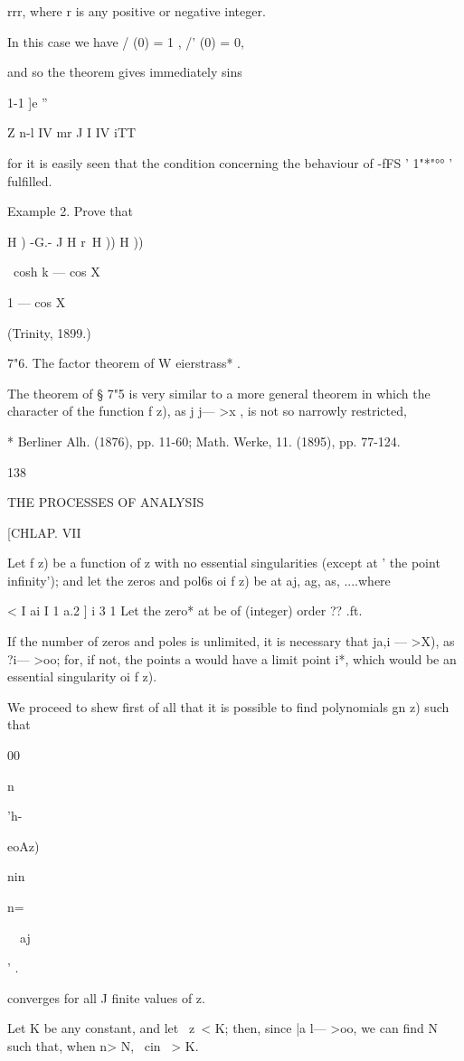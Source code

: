 rrr, where r is any positive or negative integer.

In this case we have / (0) = 1 , /' (0) = 0,

and so the theorem gives immediately sins

1-1 ]e ''

Z n-l IV mr J I IV iTT

for it is easily seen that the condition concerning the behaviour of
-fFS ' 1"*"°° ' fulfilled.

Example 2. Prove that

H ) -G.- J H r\ H )) H ))

\ cosh k — cos X

1 — cos X

(Trinity, 1899.)

7"6. The factor theorem of W eierstrass* .

The theorem of § 7"5 is very similar to a more general theorem in
which the character of the function f z), as j j— >x , is not so
narrowly restricted,

* Berliner Alh. (1876), pp. 11-60; Math. Werke, 11. (1895), pp.
77-124.

138

THE PROCESSES OF ANALYSIS

[CHLAP. VII

Let f z) be a function of z with no essential singularities (except at
' the point infinity'); and let the zeros and pol6s oi f z) be at aj,
ag, as, ....where

< I ai I 1 a.2 ] i 3 1 Let the zero* at be of (integer) order ?? .ft.

If the number of zeros and poles is unlimited, it is necessary that
ja,i — >X), as ?i— >oo; for, if not, the points a would have a limit
point i*, which would be an essential singularity oi f z).

We proceed to shew first of all that it is possible to find
polynomials gn z) such that

00

n

'h-~\

eoAz)

nin

n=\

\ \ aj

' .

converges for all J finite values of z.

Let K be any constant, and let \ z\ < K; then, since |a l— >oo, we can
find N such that, when n> N, \ cin \ > K.

